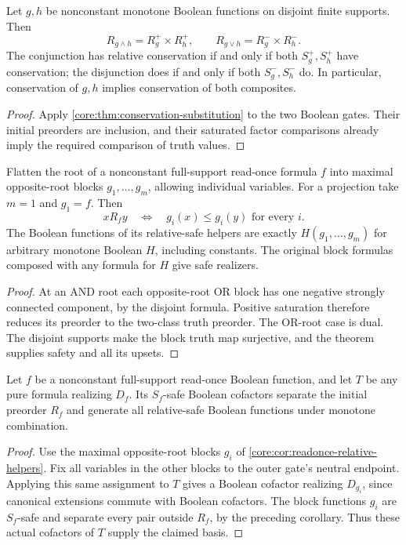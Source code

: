 \begin{corollary}
\label{core:thm:conservation-disjoint}
Let $g,h$ be nonconstant monotone Boolean functions on disjoint finite
supports. Then
\[
 R_{g\land h}=R_g^+\times R_h^+,
 \qquad
 R_{g\lor h}=R_g^-\times R_h^-.
\]
The conjunction has relative conservation if and only if both
$S_g^+,S_h^+$ have conservation; the disjunction does if and only if
both $S_g^-,S_h^-$ do. In particular, conservation of $g,h$ implies
conservation of both composites.
\end{corollary}
\begin{proof}
Apply \cref{core:thm:conservation-substitution} to the two Boolean gates.
Their initial preorders are inclusion, and their saturated factor
comparisons already imply the required comparison of truth values.
\end{proof}

\begin{corollary}
\label{core:cor:readonce-relative-helpers}
Flatten the root of a nonconstant full-support read-once formula $f$ into
maximal opposite-root blocks $g_1,\ldots,g_m$, allowing individual variables.
For a projection take $m=1$ and $g_1=f$.
Then
\[
 xR_fy\quad\Longleftrightarrow\quad
 g_i(x)\leq g_i(y)\text{ for every }i.
\]
The Boolean functions of its relative-safe helpers are exactly
$H(g_1,\ldots,g_m)$ for arbitrary monotone Boolean $H$, including constants.
The original block formulas composed with any formula for $H$ give safe
realizers.
\end{corollary}
\begin{proof}
At an AND root each opposite-root OR block has one negative strongly
connected component, by the disjoint formula. Positive saturation therefore
reduces its preorder to the two-class truth preorder. The OR-root case
is dual. The disjoint supports make the block truth map surjective, and
the theorem supplies safety and all its upsets.
\end{proof}

\begin{corollary}
\label{core:cor:readonce-cofactor-helpers}
Let $f$ be a nonconstant full-support read-once Boolean function, and let
$T$ be any pure formula realizing $D_f$. Its $S_f$-safe Boolean cofactors
separate the initial preorder $R_f$ and generate all relative-safe Boolean
functions under monotone combination.
\end{corollary}
\begin{proof}
Use the maximal opposite-root blocks $g_i$ of
\cref{core:cor:readonce-relative-helpers}. Fix all variables in the other
blocks to the outer gate's neutral endpoint. Applying this same assignment
to $T$ gives a Boolean cofactor realizing $D_{g_i}$, since canonical
extensions commute with Boolean cofactors. The block functions $g_i$ are
$S_f$-safe and separate every pair outside $R_f$, by the preceding
corollary. Thus these actual cofactors of $T$ supply the claimed basis.
\end{proof}

